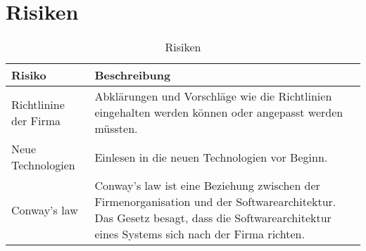 \chapter{Risiken}

\begin{table}[h!]
	\centering
	\caption{Risiken}
	\label{tab:table1}
	\begin{tabular}{ | p{2cm} | p{14cm} | }
		\toprule
		{\textbf{Risiko}} & {\textbf{Beschreibung}} \\
		\midrule
		Richtlinine der Firma & Abklärungen und Vorschläge wie die Richtlinien eingehalten werden können oder angepasst werden müssten. \\ \hline
		Neue Technologien & Einlesen in die neuen Technologien vor Beginn. \\ \hline
		Conway's law & Conway's law ist eine Beziehung zwischen der Firmenorganisation und der Softwarearchitektur. Das Gesetz besagt, dass die Softwarearchitektur eines Systems sich nach der Firma richten. \\
		\bottomrule
	\end{tabular}
\end{table}